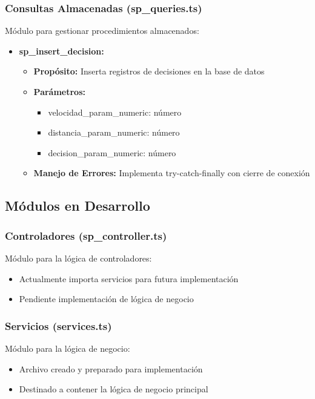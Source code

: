 \documentclass{article}
\begin{document}
\subsubsection{Consultas Almacenadas (sp\_queries.ts)}
Módulo para gestionar procedimientos almacenados:
\begin{itemize}
    \item \textbf{sp\_insert\_decision:} 
    \begin{itemize}
        \item \textbf{Propósito:} Inserta registros de decisiones en la base de datos
        \item \textbf{Parámetros:}
        \begin{itemize}
            \item velocidad\_param\_numeric: número
            \item distancia\_param\_numeric: número
            \item decision\_param\_numeric: número
        \end{itemize}
        \item \textbf{Manejo de Errores:} Implementa try-catch-finally con cierre de conexión
    \end{itemize}
\end{itemize}

\subsection{Módulos en Desarrollo}

\subsubsection{Controladores (sp\_controller.ts)}
Módulo para la lógica de controladores:
\begin{itemize}
    \item Actualmente importa servicios para futura implementación
    \item Pendiente implementación de lógica de negocio
\end{itemize}

\subsubsection{Servicios (services.ts)}
Módulo para la lógica de negocio:
\begin{itemize}
    \item Archivo creado y preparado para implementación
    \item Destinado a contener la lógica de negocio principal
\end{itemize}
\end{document}
